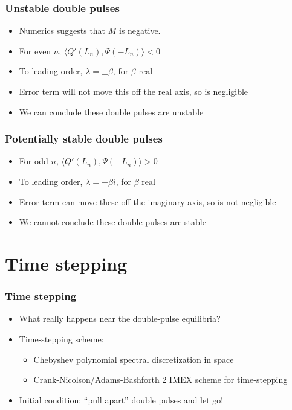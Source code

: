 \documentclass[16pt]{beamer}
\begin{document}
\begin{frame}
	\frametitle{Unstable double pulses}
	\fontsize{16}{7.2}\selectfont
	\begin{itemize}
		\item Numerics suggests that $M$ is negative.
		\item For even $n$, $\langle Q'(L_n), \Psi(-L_n) \rangle < 0$
		\item To leading order, $\lambda = \pm \beta$, for $\beta$ real
		\item Error term will not move this off the real axis, so is negligible
		\item We can conclude these double pulses are unstable
	\end{itemize}

\end{frame}

\begin{frame}
	\frametitle{Potentially stable double pulses}
	\fontsize{16}{7.2}\selectfont
	\begin{itemize}
		\item For odd $n$, $\langle Q'(L_n), \Psi(-L_n) \rangle > 0$
		\item To leading order, $\lambda = \pm \beta i $, for $\beta$ real
		\item Error term can move these off the imaginary axis, so is not negligible
		\item We cannot conclude these double pulses are stable
	\end{itemize}

\end{frame}

\section{Time stepping}

\begin{frame}
	\frametitle{Time stepping}
	\fontsize{16}{7.2}\selectfont
	\begin{itemize}
		\item<1->What really happens near the double-pulse equilibria?
		\item<2->Time-stepping scheme:
		\begin{itemize}
			\item Chebyshev polynomial spectral discretization in space
			\item Crank-Nicolson/Adams-Bashforth 2 IMEX scheme for time-stepping
		\end{itemize}
		\item<3->Initial condition: ``pull apart'' double pulses and let go!
	\end{itemize}
\end{frame}
\end{document}
